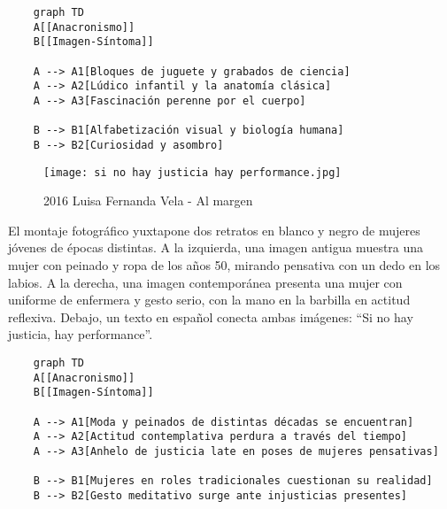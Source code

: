 \small
\singlespacing \begin{verbatim}
    graph TD
    A[[Anacronismo]]
    B[[Imagen-Síntoma]]

    A --> A1[Bloques de juguete y grabados de ciencia]
    A --> A2[Lúdico infantil y la anatomía clásica]
    A --> A3[Fascinación perenne por el cuerpo]

    B --> B1[Alfabetización visual y biología humana]
    B --> B2[Curiosidad y asombro]
\end{verbatim}
\normalsize

\clearpage
\begin{figure}[h!]
    \centering
    \texttt{[image: si no hay justicia hay performance.jpg]}
    \caption{2016 Luisa Fernanda Vela - Al margen}
    \label{fig:LuisaVela2016}
\end{figure}

El montaje fotográfico yuxtapone dos retratos en blanco y negro de mujeres jóvenes de épocas distintas. A la izquierda, una imagen antigua muestra una mujer con peinado y ropa de los años 50, mirando pensativa con un dedo en los labios. A la derecha, una imagen contemporánea presenta una mujer con uniforme de enfermera y gesto serio, con la mano en la barbilla en actitud reflexiva. Debajo, un texto en español conecta ambas imágenes: ``Si no hay justicia, hay performance''.

\small
\singlespacing \begin{verbatim}
    graph TD
    A[[Anacronismo]]
    B[[Imagen-Síntoma]]

    A --> A1[Moda y peinados de distintas décadas se encuentran]
    A --> A2[Actitud contemplativa perdura a través del tiempo]
    A --> A3[Anhelo de justicia late en poses de mujeres pensativas]

    B --> B1[Mujeres en roles tradicionales cuestionan su realidad]
    B --> B2[Gesto meditativo surge ante injusticias presentes]
\end{verbatim}
\normalsize

